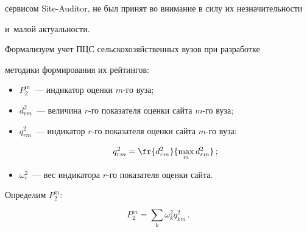 сервисом Site-Auditor, не был принят во внимание в силу их незначительности 


и~малой актуальности.


  


  Формализуем учет ПЦС сельскохозяйственных вузов при разработке 


методики формирования их рейтингов:


  \begin{itemize}


  \item $P_2^m$~--- индикатор оценки $m$-го вуза;


\item $d_{rm}^2$~--- величина $r$-го показателя оценки сайта $m$-го вуза; 


\item $q_{rm}^2$~--- индикатор $r$-го показателя оценки сайта $m$-го вуза:





\noindent


 $$


 q_{rm}^2= \fr{d^2_{rm}}{\max_m d_{rm}^2}\,;


 $$


 


 \vspace*{-12pt}


 


\item $\omega_r^2$~--- вес индикатора $r$-го показателя оценки сайта. 


\end{itemize}


 


\vspace*{-3pt}





Определим $P_2^m$:





\noindent


\begin{equation}


P_2^m=\sum\limits_k \omega_k^2 q^2_{km}\,.


\label{e1-med}


\end{equation}


